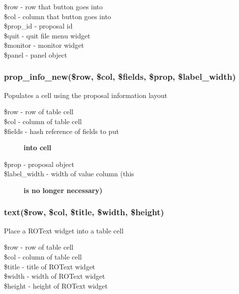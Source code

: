 \documentclass{article}
\begin{document}
\begin{description}

\item[{\$row - row that button goes into}] \mbox{}
\item[{\$col - column that button goes into}] \mbox{}
\item[{\$prop\_id - proposal id}] \mbox{}
\item[{\$quit - quit file menu widget}] \mbox{}
\item[{\$monitor - monitor widget}] \mbox{}
\item[{\$panel - panel object}] \mbox{}\end{description}
\subsubsection*{prop\_info\_new(\$row, \$col, \$fields, \$prop, \$label\_width)\label{BuildTable_prop_info_new_row_col_fields_prop_label_width_}}


Populates a cell using the proposal information layout

\begin{description}

\item[{\$row - row of table cell}] \mbox{}
\item[{\$col - column of table cell}] \mbox{}
\item[{\$fields - hash reference of fields to put}] \textbf{into cell}
\item[{\$prop - proposal object}] \mbox{}
\item[{\$label\_width - width of value column (this}] \textbf{is no longer necessary)}\end{description}
\subsubsection*{text(\$row, \$col, \$title, \$width, \$height)\label{BuildTable_text_row_col_title_width_height_}}


Place a ROText widget into a table cell

\begin{description}

\item[{\$row - row of table cell}] \mbox{}
\item[{\$col - column of table cell}] \mbox{}
\item[{\$title - title of ROText widget}] \mbox{}
\item[{\$width - width of ROText widget}] \mbox{}
\item[{\$height - height of ROText widget}] \mbox{}\end{description}
\end{document}
